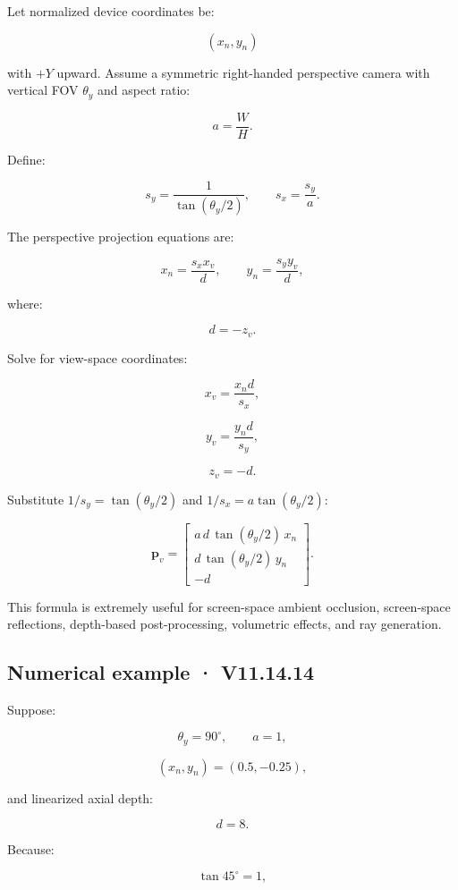 \hypertarget{02-foundations-ii-ch035-method-a-reconstruct-from-ndc-and-fov}{}

Let normalized device coordinates be:

\[ (x_n,y_n) \]

with \(+Y\) upward. Assume a symmetric right-handed perspective camera with vertical FOV \(\theta_y\) and aspect ratio:

\[ a=\frac WH. \]

Define:

\[ s_y=\frac1{\tan(\theta_y/2)}, \qquad s_x=\frac{s_y}{a}. \]

The perspective projection equations are:

\[ x_n=\frac{s_xx_v}{d}, \qquad y_n=\frac{s_yy_v}{d}, \]

where:

\[ d=-z_v. \]

Solve for view-space coordinates:

\[ x_v=\frac{x_nd}{s_x}, \]

\[ y_v=\frac{y_nd}{s_y}, \]

\[ z_v=-d. \]

Substitute \(1/s_y=\tan(\theta_y/2)\) and \(1/s_x=a\tan(\theta_y/2)\):

\[ \boxed{ \mathbf p_v= \begin{bmatrix} a\,d\,\tan(\theta_y/2)\,x_n\\ d\,\tan(\theta_y/2)\,y_n\\ -d \end{bmatrix}. } \]

This formula is extremely useful for screen-space ambient occlusion, screen-space reflections, depth-based post-processing, volumetric effects, and ray generation.

\subsection{Numerical example · V11.14.14}\label{02-foundations-ii-ch035-numerical-example-v11.14.14}

\hypertarget{02-foundations-ii-ch035-numerical-example-v11.14.14}{}

Suppose:

\[ \theta_y=90^\circ,\qquad a=1, \]

\[ (x_n,y_n)=(0.5,-0.25), \]

and linearized axial depth:

\[ d=8. \]

Because:

\[ \tan45^\circ=1, \]

